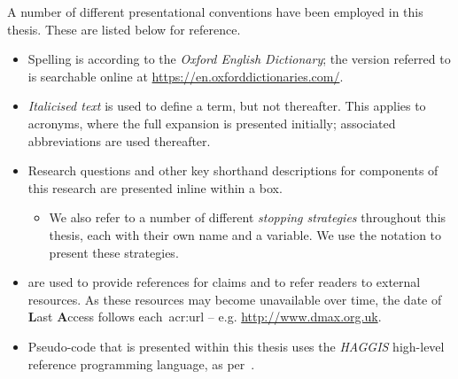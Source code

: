 
\begin{preamble}
{}

A number of different presentational conventions have been employed in this thesis. These are listed below for reference.


\begin{itemize}
    
    \item{Spelling is according to the \emph{Oxford English Dictionary}; the version referred to is searchable online at \url{https://en.oxforddictionaries.com/}.}
    
    \item{\emph{Italicised text} is used to define a term, but not thereafter. This applies to acronyms, where the full expansion is presented initially; associated abbreviations are used thereafter.}
    
    \item{Research questions and other key shorthand descriptions for components of this research are presented inline within a  box.}
    
    \begin{itemize}
        
        \item{We also refer to a number of different \emph{stopping strategies} throughout this thesis, each with their own name and a variable. We use the notation  to present these strategies.}
        
    \end{itemize}
    
    \item{ are used to provide references for claims and to refer readers to external resources. As these resources may become unavailable over time, the date of \textbf{L}ast \textbf{A}ccess follows each~\gls{acr:url} -- e.g. \url{http://www.dmax.org.uk}.}
    
    \item{Pseudo-code that is presented within this thesis uses the \emph{HAGGIS} high-level reference programming language, as per~\cite{cutts2014haggis}.}
    
\end{itemize}


\end{preamble}
